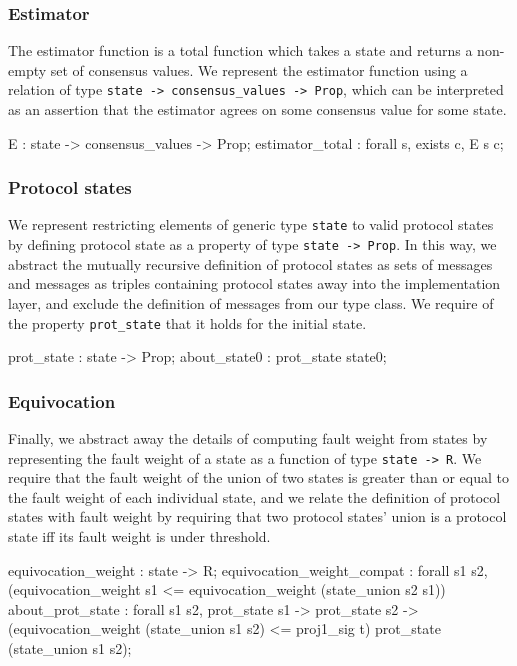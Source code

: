 \documentclass[runningheads]{llncs}
\begin{document}
\subsubsection{Estimator} 
The estimator function is a total function which takes a state and returns a non-empty set of consensus values. We represent the estimator function using a relation of type \verb|state -> consensus_values -> Prop|, which can be interpreted as an assertion that the estimator agrees on some consensus value for some state. 
\begin{coq}
	E : state -> consensus_values -> Prop; 
	estimator_total : forall s, exists c, E s c; 
\end{coq}

\subsubsection{Protocol states}
We represent restricting elements of generic type \verb|state| to valid protocol states by defining protocol state as a property of type \verb|state -> Prop|. In this way, we abstract the mutually recursive definition of protocol states as sets of messages and messages as triples containing protocol states away into the implementation layer, and exclude the definition of messages from our type class. We require of the property \verb|prot_state| that it holds for the initial state. 
\begin{coq}
	prot_state : state -> Prop; 
	about_state0 : prot_state state0; 
\end{coq}

\subsubsection{Equivocation} 
Finally, we abstract away the details of computing fault weight from states by representing the fault weight of a state as a function of type \verb|state -> R|. We require that the fault weight of the union of two states is greater than or equal to the fault weight of each individual state, and we relate the definition of protocol states with fault weight by requiring that two protocol states' union is a protocol state iff its fault weight is under threshold. 
\begin{coq}
	equivocation_weight : state -> R; 
	equivocation_weight_compat : forall s1 s2, 
	 (equivocation_weight s1 <= 
	 equivocation_weight (state_union s2 s1))%
	about_prot_state : forall s1 s2, 
									prot_state s1 -> prot_state s2 ->
									(equivocation_weight (state_union s1 s2) 
									<= proj1_sig t)%
									prot_state (state_union s1 s2);
\end{coq}
\end{document}
